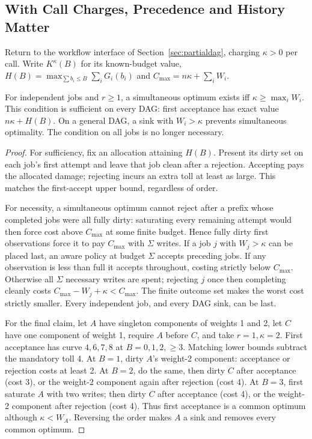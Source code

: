 \subsection{With Call Charges, Precedence and History Matter}
\label{sec:tolldag}

Return to the workflow interface of Section~\ref{sec:partialdag}, charging $\kappa>0$ per call. Write $K^{\kappa}(B)$ for its known-budget value, $H(B)=\max_{\sum b_i\le B}\sum_iG_i(b_i)$ and $C_{\max}=n\kappa+\sum_iW_i$.

\begin{theorem}
\label{thm:tolldag}
For independent jobs and $r\ge1$, a simultaneous optimum exists iff $\kappa\ge\max_iW_i$. This condition is sufficient on every DAG: first acceptance has exact value $n\kappa+H(B)$. On a general DAG, a sink with $W_i>\kappa$ prevents simultaneous optimality. The condition on all jobs is no longer necessary.
\end{theorem}
\begin{proof}
For sufficiency, fix an allocation attaining $H(B)$. Present its dirty set on each job's first attempt and leave that job clean after a rejection. Accepting pays the allocated damage; rejecting incurs an extra toll at least as large. This matches the first-accept upper bound, regardless of order.

For necessity, a simultaneous optimum cannot reject after a prefix whose completed jobs were all fully dirty: saturating every remaining attempt would then force cost above $C_{\max}$ at some finite budget. Hence fully dirty first observations force it to pay $C_{\max}$ with $\Sigma$ writes. If a job $j$ with $W_j>\kappa$ can be placed last, an aware policy at budget $\Sigma$ accepts preceding jobs. If any observation is less than full it accepts throughout, costing strictly below $C_{\max}$. Otherwise all $\Sigma$ necessary writes are spent; rejecting $j$ once then completing cleanly costs $C_{\max}-W_j+\kappa<C_{\max}$. The finite outcome set makes the worst cost strictly smaller. Every independent job, and every DAG sink, can be last.

For the final claim, let $A$ have singleton components of weights 1 and 2, let $C$ have one component of weight 1, require $A$ before $C$, and take $r=1,\kappa=2$. First acceptance has curve $4,6,7,8$ at $B=0,1,2,\ge3$. Matching lower bounds subtract the mandatory toll 4. At $B=1$, dirty $A$'s weight-2 component: acceptance or rejection costs at least 2. At $B=2$, do the same, then dirty $C$ after acceptance (cost 3), or the weight-2 component again after rejection (cost 4). At $B=3$, first saturate $A$ with two writes; then dirty $C$ after acceptance (cost 4), or the weight-2 component after rejection (cost 4). Thus first acceptance is a common optimum although $\kappa<W_A$. Reversing the order makes $A$ a sink and removes every common optimum.
\end{proof}

